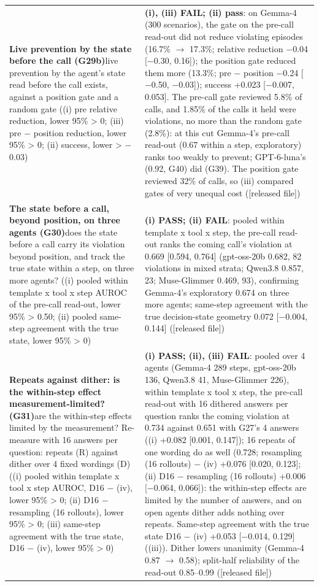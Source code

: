 {\begin{longtable}{p{}p{}}
\textbf{Live prevention by the state before the call (G29b)}\newline live prevention by the agent's state read before the call exists, against a position gate and a random gate ((i) pre relative reduction, lower 95\% > 0; (iii) pre $-$ position reduction, lower 95\% > 0; (ii) success, lower > $-$0.03) & \textbf{(i), (iii) FAIL; (ii) pass}: on Gemma-4 (300 scenarios), the gate on the pre-call read-out did not reduce violating episodes (16.7\% $\rightarrow$ 17.3\%; relative reduction $-$0.04 [$-$0.30, 0.16]); the position gate reduced them more (13.3\%; pre $-$ position $-$0.24 [$-$0.50, $-$0.03]); success +0.023 [$-$0.007, 0.053]. The pre-call gate reviewed 5.8\% of calls, and 1.85\% of the calls it held were violations, no more than the random gate (2.8\%): at this cut Gemma-4's pre-call read-out (0.67 within a step, exploratory) ranks too weakly to prevent; GPT-6-luna's (0.92, G40) did (G39). The position gate reviewed 32\% of calls, so (iii) compared gates of very unequal cost ([released file])\\[2pt]
\textbf{The state before a call, beyond position, on three agents (G30)}\newline does the state before a call carry its violation beyond position, and track the true state within a step, on three more agents? ((i) pooled within template x tool x step AUROC of the pre-call read-out, lower 95\% > 0.50; (ii) pooled same-step agreement with the true state, lower 95\% > 0) & \textbf{(i) PASS; (ii) FAIL}: pooled within template x tool x step, the pre-call read-out ranks the coming call's violation at 0.669 [0.594, 0.764] (gpt-oss-20b 0.682, 82 violations in mixed strata; Qwen3.8 0.857, 23; Muse-Glimmer 0.469, 93), confirming Gemma-4's exploratory 0.674 on three more agents; same-step agreement with the true decision-state geometry 0.072 [$-$0.004, 0.144] ([released file])\\[2pt]
\textbf{Repeats against dither: is the within-step effect measurement-limited? (G31)}\newline are the within-step effects limited by the measurement? Re-measure with 16 answers per question: repeats (R) against dither over 4 fixed wordings (D) ((i) pooled within template x tool x step AUROC, D16 $-$ (iv), lower 95\% > 0; (ii) D16 $-$ resampling (16 rollouts), lower 95\% > 0; (iii) same-step agreement with the true state, D16 $-$ (iv), lower 95\% > 0) & \textbf{(i) PASS; (ii), (iii) FAIL}: pooled over 4 agents (Gemma-4 289 steps, gpt-oss-20b 136, Qwen3.8 41, Muse-Glimmer 226), within template x tool x step, the pre-call read-out with 16 dithered answers per question ranks the coming violation at 0.734 against 0.651 with G27's 4 answers ((i) +0.082 [0.001, 0.147]); 16 repeats of one wording do as well (0.728; resampling (16 rollouts) $-$ (iv) +0.076 [0.020, 0.123]; (ii) D16 $-$ resampling (16 rollouts) +0.006 [$-$0.064, 0.066]): the within-step effects are limited by the number of answers, and on open agents dither adds nothing over repeats. Same-step agreement with the true state D16 $-$ (iv) +0.053 [$-$0.014, 0.129] ((iii)). Dither lowers unanimity (Gemma-4 0.87 $\rightarrow$ 0.58); split-half reliability of the read-out 0.85--0.99 ([released file])\\[2pt]

\end{longtable}}
